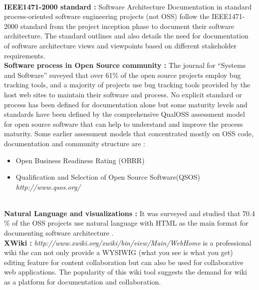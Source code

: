 \newline
\\\indent \textbf{IEEE1471-2000 standard : }Software Architecture Documentation in standard process-oriented software engineering projects (not OSS) follow the IEEE1471-2000 standard \cite{BachmannDocumentingSoftware2010} from the project inception phase to document their software architecture. The standard outlines and also details the need for documentation of software architecture views and viewpoints based on different stakeholder requirements.
\newline
\\\indent \textbf{Software process in Open Source community : } The journal for \enquote{Systems and Software} \cite{Zhao2003} suveyed that over 61\% of the open source projects employ bug tracking tools, and a majority of projects use bug tracking tools provided by the host web sites to maintain their software and process. No explicit standard or process has been defined for documentation alone but some maturity levels and standards have been defined by the comprehensive QualOSS assessment model \cite{5314237}for open source software that can help to understand and improve the process maturity. Some earlier assessment models that concentrated mostly on OSS code, documentation and community structure are :
\begin{itemize}
\item Open Business Readiness Rating (OBRR)\cite{Golden2006}
\item Qualification and Selection of Open Source Software(QSOS) \emph{http://www.qsos.org/}
\end{itemize}
\indent 
\\\indent \textbf{Natural Language and visualizations : } It was surveyed and studied that 70.4 \% of the OSS projects use natural language with HTML as the main format for documenting software architecture \cite{6923128}. 
\newline
\\\indent \textbf{XWiki : } \emph{http://www.xwiki.org/xwiki/bin/view/Main/WebHome} is a professional wiki the can not only provide a WYSIWIG (what you see is what you get) editing feature for content collaboration but can also be used for collaborative web applications. The popularity of this wiki tool suggests the demand for wiki as a platform for documentation and collaboration.

